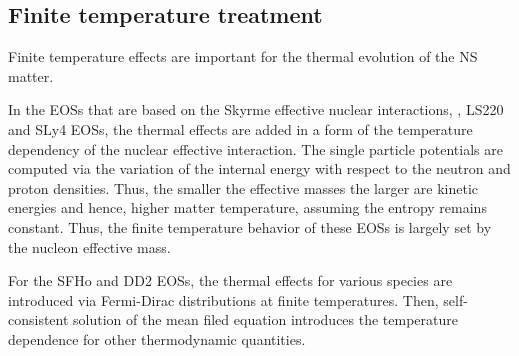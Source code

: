 \subsection{Finite temperature treatment}

Finite temperature effects are important for the thermal evolution of the \ac{NS} matter.



In the \acp{EOS} that are based on the Skyrme effective nuclear interactions, 
\eg, LS220 and SLy4 \acp{EOS}, the thermal effects are added 
in a form of the temperature dependency of the nuclear effective interaction. %
%
The single particle potentials are computed via the variation of the internal 
energy with respect to the neutron and proton densities. Thus, the smaller the effective 
masses the larger are kinetic energies and hence, higher matter temperature, assuming 
the entropy remains constant.
%
Thus, the finite temperature behavior of these \acp{EOS} is largely set by the nucleon effective mass. 

%
For the SFHo and DD2 \acp{EOS}, 
the thermal effects for various species are introduced via Fermi-Dirac distributions at finite temperatures.
Then, self-consistent solution of the mean filed equation introduces the temperature dependence for other 
thermodynamic quantities.%

